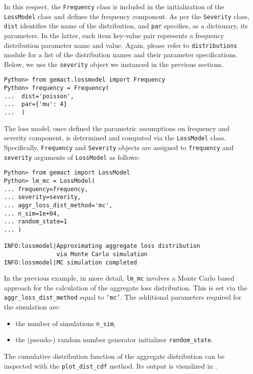 \documentclass{article}
\begin{document}
In this respect, the \texttt{Frequency} class is included in the initialization of the \texttt{LossModel} class and defines the frequency component.
%
As per the \texttt{Severity} class, \texttt{dist} identifies the name of the distribution, and 
\texttt{par} specifies, as a dictionary, its parameters. In the latter, each item key-value pair represents a frequency distribution parameter name and value. Again, please refer to \texttt{distributions} module for a list of the distribution names and their parameter specifications.
Below, we use the \texttt{severity} object we instanced in the previous sections.

\begin{lstlisting}
Python> from gemact.lossmodel import Frequency
Python> frequency = Frequency(
...  dist='poisson',
...  par={'mu': 4}
...  )
\end{lstlisting}

The loss model, once defined the parametric assumptions on frequency and severity component, is determined and computed via the \texttt{LossModel} class. Specifically, \texttt{Frequency} and \texttt{Severity} objects are assigned to \texttt{frequency} and \texttt{severity} arguments of \texttt{LossModel} as follows:

\begin{lstlisting}
Python> from gemact import LossModel
Python> lm_mc = LossModel(
... frequency=frequency,
... severity=severity,
... aggr_loss_dist_method='mc',
... n_sim=1e+04,
... random_state=1
... )

INFO:lossmodel|Approximating aggregate loss distribution
               via Monte Carlo simulation
INFO:lossmodel|MC simulation completed
\end{lstlisting}

In the previous example, in more detail, \texttt{lm\_mc}  involves a Monte Carlo based approach for the calculation of the aggregate loss distribution. This is set via the \texttt{aggr\_loss\_dist\_method} equal to \texttt{`mc'}.
The additional parameters required for the simulation are: 

\begin{itemize}
    \item the number of simulations \texttt{n\_sim},
    
    \item the (pseudo-) random number generator initializer \texttt{random\_state}.
\end{itemize}

The cumulative distribution function of the aggregate distribution can be inspected with the \texttt{plot\_dist\_cdf} method. Its output is visualized in .
\end{document}
